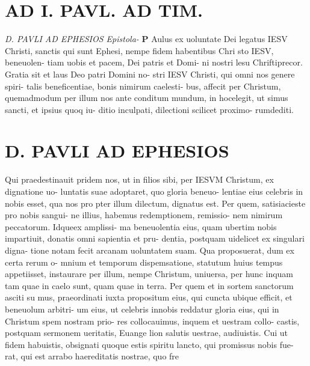 \documentclass{article}
\begin{document}
\begin{pages}
\section*{AD I. PAVL. AD TIM. }
\marginpar{[ p.9 ]}
\marginpar{[ p.10 ]}
\marginpar{[ p.11 ]}
\marginpar{[ p.B ]}
\textit{D. PAVLI AD EPHESIOS Epistola- }
\textbf{P }\pstart Aulus ex uoluntate Dei legatus IESV Christi, sanctis qui sunt Ephesi, nempe fidem habentibus Chri sto IESV, beneuolen- tiam uobis et pacem, Dei patris et Domi- ni nostri lesu Chriftiprecor.  \pend\pstart Gratia sit et laus Deo patri Domini no- stri IESV Christi, qui omni nos genere spiri- talis beneficentiae, bonis nimirum caelesti- bus, affecit per Christum, quemadmodum per illum nos ante conditum mundum, in hocelegit, ut simus sancti, et ipsius quoq iu- ditio inculpati, dilectioni scilicet proximo- rumdediti.  \pend
\section*{D. PAVLI AD EPHESIOS }
\marginpar{[ p.3.  ]}
\marginpar{[ p.4.  ]}
\marginpar{[ p.5.  ]}
\marginpar{[ p.6.  ]}
\marginpar{[ p.7.  ]}\pstart Qui praedestinauit pridem nos, ut in filios sibi, per IESVM Christum, ex dignatione uo- luntatis suae adoptaret, quo gloria beneuo- lentiae eius celebris in nobis esset, qua nos pro pter illum dilectum, dignatus est.  \pend\pstart Per  quem, satisiacieste pro nobis sangui- ne illius, habemus redemptionem, remissio- nem nimirum peccatorum.  Idqueex amplissi- ma beneuolentia eius, quam ubertim nobis impartiuit, donatis omni sapientia et pru- dentia, postquam uidelicet ex singulari digna- tione notam fecit arcanam uoluntatem suam.  \pend\pstart Qua proposuerat, dum ex certa rerum o- mnium et temporum dispemsatione, statutum huius tempus appetiisset, instaurare per illum, nempe Christum, uniuersa, per hunc inquam tam quae in caelo sunt, quam quae in terra.  \pend\pstart Per quem et in sortem sanctorum asciti su mus, praeordinati iuxta propositum eius, qui cuncta ubique efficit, et beneuolum arbitri- um eius, ut celebris innobis reddatur gloria eius, qui in Christum spem nostram prio- res collocauimus, inquem et uestram collo- castis, postquam sermonem ueritatis, Euange lion salutis uestrae, audiuistis.  \pend\pstart Cui ut fidem habuistis, obsignati quoque estis spiritu lancto, qui promissus nobis fue- rat, qui est arrabo haereditatis nostrae, quo fre  \pend

\end{pages}
\end{document}
